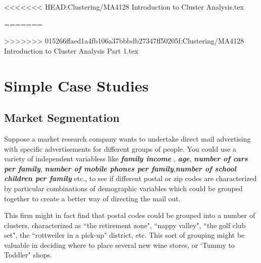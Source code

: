 \documentclass[a4paper,12pt]{article}
\begin{document}
<<<<<<< HEAD:Clustering/MA4128 Introduction to Cluster Analysis.tex

=======

%
%


>>>>>>> 015266ffaed1a4fb106a37bbbdb27347ff50205f:Clustering/MA4128 Introduction to Cluster Analysis Part 1.tex


\section{Simple Case Studies}
\subsection{Market Segmentation}
Suppose a market research company wants to undertake direct mail advertising with specific advertisements
for different groups of people. You could use a variety of independent variabless like \textbf{\textit{family income}}
, \textbf{\textit{age}}, \textbf{\textit{number of cars per family}}, \textbf{\textit{number of mobile phones per family}},\textbf{\textit{number of school children per family}}  etc., to see if different postal or zip codes are characterized by particular combinations of demographic variables which could be grouped together to create a better way of directing the mail out.

This firm might in fact find that postal codes could be grouped into a number of clusters, characterized as ``the retirement zone", ``nappy valley", ``the golf club set", the ``rottweiler in a pick-up" district, etc. This sort of grouping might  be valuable in deciding where to place several new wine stores, or `Tummy to Toddler" shops.
\end{document}
